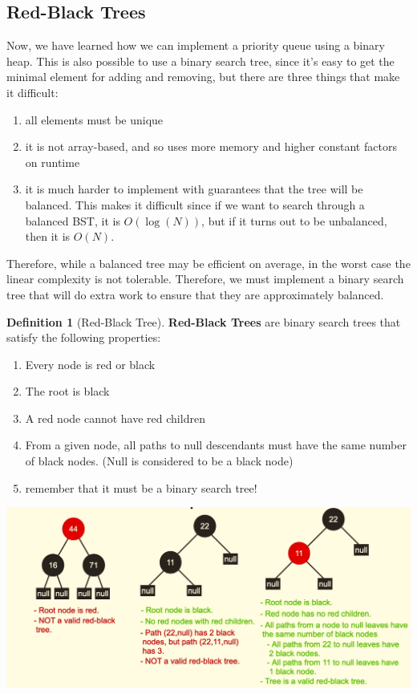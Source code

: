 \documentclass{article}
\theoremstyle{definition}
\theoremstyle{remark}
\theoremstyle{definition}
\newtheorem{definition}{Definition}[section]
\begin{document}
\subsection{Red-Black Trees}

Now, we have learned how we can implement a priority queue using a binary heap. This is also possible to use a binary search tree, since it's easy to get the minimal element for adding and removing, but there are three things that make it difficult: 
\begin{enumerate}
    \item all elements must be unique 
    \item it is not array-based, and so uses more memory and higher constant factors on runtime 
    \item it is much harder to implement with guarantees that the tree will be balanced. This makes it difficult since if we want to search through a balanced BST, it is $O(\log(N))$, but if it turns out to be unbalanced, then it is $O(N)$. 
\end{enumerate}
Therefore, while a balanced tree may be efficient on average, in the worst case the linear complexity is not tolerable. Therefore, we must implement a binary search tree that will do extra work to ensure that they are approximately balanced. 

\begin{definition}[Red-Black Tree]
\textbf{Red-Black Trees} are binary search trees that satisfy the following properties: 
\begin{enumerate}
    \item Every node is red or black 
    \item The root is black 
    \item A red node cannot have red children 
    \item From a given node, all paths to null descendants must have the same number of black nodes. (Null is considered to be a black node)
    \item remember that it must be a binary search tree! 
\end{enumerate}
\begin{center}
    \includegraphics[scale=0.4]{img/red_black_trees.png}
\end{center}
\end{definition}
\end{document}
